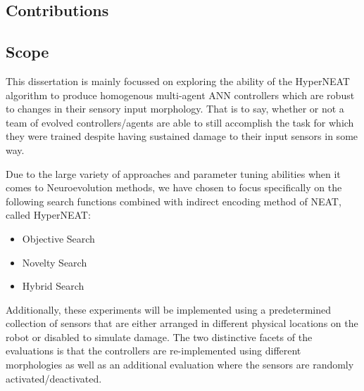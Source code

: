 \subsection{Contributions}




\subsection{Scope}

This dissertation is mainly focussed on exploring the ability of the HyperNEAT algorithm to produce homogenous multi-agent ANN controllers which are robust to changes in their sensory input morphology. That is to say, whether or not a team of evolved controllers/agents are able to still accomplish the task for which they were trained despite having sustained damage to their input sensors in some way.

Due to the large variety of approaches and parameter tuning abilities when it comes to Neuroevolution methods, we have chosen to focus specifically on the following search functions combined with indirect encoding method of NEAT, called HyperNEAT:
\begin{itemize}
	\item Objective Search
	\item Novelty Search
	\item Hybrid Search
\end{itemize}

Additionally, these experiments will be implemented using a predetermined collection of sensors that are either arranged in different physical locations on the robot or disabled to simulate damage.  The two distinctive facets of the evaluations is that the controllers are re-implemented using different morphologies as well as an additional evaluation where the sensors are randomly activated/deactivated.

